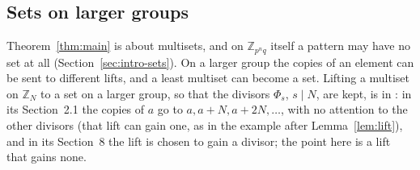 \documentclass[11pt,a4paper]{amsart}
\theoremstyle{definition}
\theoremstyle{remark}
\newcommand{\Z}{\mathbb{Z}}
\begin{document}
\subsection*{Sets on larger groups}

Theorem~\ref{thm:main} is about multisets, and on $\Z_{p^nq}$ itself a pattern may have no set at all
(Section~\ref{sec:intro-sets}). On a larger group the copies of an element can be sent to different lifts, and a
least multiset can become a set. Lifting a multiset on $\Z_N$ to a set on a larger group, so that the divisors
$\Phi_s$, $s\mid N$, are kept, is in \cite{KLaMS}: in its Section~2.1 the copies of $a$ go to $a,a+N,a+2N,\dots$,
with no attention to the other divisors (that lift can gain one, as in the example after Lemma~\ref{lem:lift}),
and in its Section~8 the lift is chosen to gain a divisor; the point here is a lift that gains none.
\end{document}
